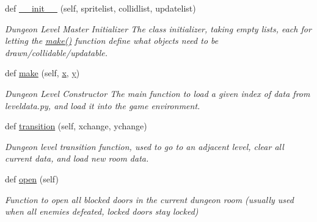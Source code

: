 \begin{DoxyCompactItemize}
\item 
def \hyperlink{classcollision_1_1levelmanager_1_1_level_manager_ac15451905c2523ed3929d877762bb290}{\+\_\+\+\_\+init\+\_\+\+\_\+} (self, spritelist, collidlist, updatelist)
\begin{DoxyCompactList}\small\item\em Dungeon Level Master Initializer  The class initializer, taking empty lists, each for letting the \hyperlink{classcollision_1_1levelmanager_1_1_level_manager_a02aa3ee9b35d68c9386517c518c101f4}{make()} function define what objects need to be drawn/collidable/updatable. \end{DoxyCompactList}\item 
def \hyperlink{classcollision_1_1levelmanager_1_1_level_manager_a02aa3ee9b35d68c9386517c518c101f4}{make} (self, \hyperlink{classcollision_1_1levelmanager_1_1_level_manager_a5d1c987dbd37f1da1496915d4a754d70}{x}, \hyperlink{classcollision_1_1levelmanager_1_1_level_manager_a5b6011487a9ea527e43194554dbf1326}{y})
\begin{DoxyCompactList}\small\item\em Dungeon Level Constructor  The main function to load a given index of data from leveldata.\+py, and load it into the game environment. \end{DoxyCompactList}\item 
def \hyperlink{classcollision_1_1levelmanager_1_1_level_manager_ac73f0ef69a1d1ff85a906a68cb1e2c86}{transition} (self, xchange, ychange)
\begin{DoxyCompactList}\small\item\em Dungeon level transition function, used to go to an adjacent level, clear all current data, and load new room data. \end{DoxyCompactList}\item 
\mbox{\label{classcollision_1_1levelmanager_1_1_level_manager_a5eb6314d72a5b6a438eb85ef1a926ce0}} 
def \hyperlink{classcollision_1_1levelmanager_1_1_level_manager_a5eb6314d72a5b6a438eb85ef1a926ce0}{open} (self)
\begin{DoxyCompactList}\small\item\em Function to open all blocked doors in the current dungeon room (usually used when all enemies defeated, locked doors stay locked) \end{DoxyCompactList}\item 
\mbox{\label{classcollision_1_1levelmanager_1_1_level_manager_ab31d4ea306a0ef50bf25a4a4dd3b9aaf}} 

\end{DoxyCompactItemize}
